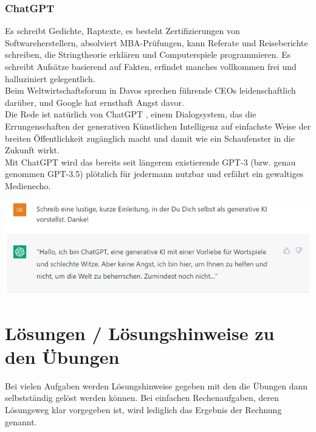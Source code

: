\documentclass[12pt]{article}
\begin{document}
\subsubsection{ChatGPT}
%
Es schreibt Gedichte, Raptexte, es besteht Zertifizierungen von Softwareherstellern, absolviert MBA-Prüfungen, kann Referate und Reiseberichte schreiben, die Stringtheorie erklären und Computerspiele programmieren. Es schreibt Aufsätze basierend auf Fakten, erfindet manches vollkommen frei und halluziniert gelegentlich. \\
Beim Weltwirtschaftsforum in Davos sprechen führende CEOs leidenschaftlich darüber, und Google hat ernsthaft Angst davor.\\
%
Die Rede ist natürlich von ChatGPT , einem Dialogsystem, das die Errungenschaften der generativen Künstlichen Intelligenz auf einfachste Weise der breiten Öffentlichkeit zugänglich macht und damit wie ein Schaufenster in die Zukunft wirkt. \\
Mit ChatGPT wird das bereits seit längerem existierende GPT-3 (bzw.
genau genommen GPT-3.5) plötzlich für jedermann nutzbar und erfährt ein gewaltiges Medienecho.
%
\begin{center}
\includegraphics{ChatGPT-Text1} 
\end{center}
%
\newpage

\section{Lösungen / Lösungshinweise zu den Übungen \\}

Bei vielen Aufgaben werden Lösungshinweise gegeben mit den die Übungen dann selbstständig gelöst werden können. Bei einfachen Rechenaufgaben, deren Lösungsweg klar vorgegeben ist, wird lediglich das Ergebnis der Rechnung genannt.\\
{\color{red}{*******************************************************************\\ ab hier bis Ende der Hinweise sind die Folien der Vorlesung ML  zu nutzen und diese sind in Latex umzusetzen\\
********************************************************************\\}}
\end{document}
